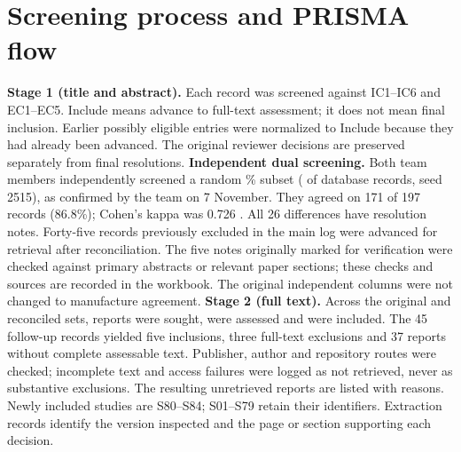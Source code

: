 \section{Screening process and PRISMA flow}
\textbf{Stage 1 (title and abstract).} Each record was screened against IC1--IC6 and EC1--EC5. Include means advance to full-text assessment; it does not mean final inclusion. Earlier possibly eligible entries were normalized to Include because they had already been advanced. The original reviewer decisions are preserved separately from final resolutions.
\textbf{Independent dual screening.} Both team members independently screened a random \dualPct\% subset (\dualN{} of \dualPool{} database records, seed 2515), as confirmed by the team on 7 November. They agreed on 171 of 197 records (86.8\%); Cohen's kappa was 0.726 \cite{cohen1960}. All 26 differences have resolution notes. Forty-five records previously excluded in the main log were advanced for retrieval after reconciliation. The five notes originally marked for verification were checked against primary abstracts or relevant paper sections; these checks and sources are recorded in the workbook. The original independent columns were not changed to manufacture agreement.
\textbf{Stage 2 (full text).} Across the original and reconciled sets, \totalSought{} reports were sought, \totalAssessed{} were assessed and \totalIncluded{} were included. The 45 follow-up records yielded five inclusions, three full-text exclusions and 37 reports without complete assessable text. Publisher, author and repository routes were checked; incomplete text and access failures were logged as not retrieved, never as substantive exclusions. The resulting \totalNotRetrieved{} unretrieved reports are listed with reasons. Newly included studies are S80--S84; S01--S79 retain their identifiers. Extraction records identify the version inspected and the page or section supporting each decision.
